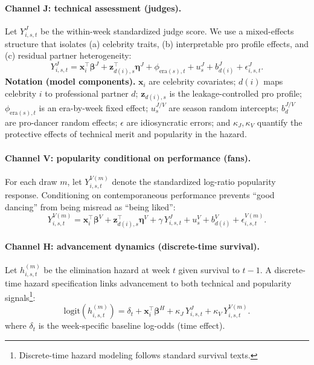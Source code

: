 \paragraph{Channel J: technical assessment (judges).}
Let $Y^J_{i,s,t}$ be the within-week standardized judge score. We use a mixed-effects structure that isolates (a) celebrity traits, (b) interpretable pro profile effects, and (c) residual partner heterogeneity:
\begin{equation}
Y^J_{i,s,t}
=
\mathbf x_i^\top \boldsymbol\beta^J
+
\mathbf z_{d(i),s}^\top \boldsymbol\eta^J
+
\phi_{\mathrm{era}(s),t}
+
u_s^J
+
b^J_{d(i)}
+
\epsilon^J_{i,s,t}.
\label{eq:q3_judge_lmm}
\end{equation}
\noindent\textbf{Notation (model components).}
$\mathbf x_i$ are celebrity covariates; $d(i)$ maps celebrity $i$ to professional partner $d$; $\mathbf z_{d(i),s}$ is the leakage-controlled pro profile; $\phi_{\mathrm{era}(s),t}$ is an era-by-week fixed effect; $u_s^{J/V}$ are season random intercepts; $b_{d}^{J/V}$ are pro-dancer random effects; $\epsilon$ are idiosyncratic errors; and $\kappa_J,\kappa_V$ quantify the protective effects of technical merit and popularity in the hazard.


\paragraph{Channel V: popularity conditional on performance (fans).}
For each draw $m$, let $Y^{V(m)}_{i,s,t}$ denote the standardized log-ratio popularity response. Conditioning on contemporaneous performance prevents ``good dancing'' from being misread as ``being liked'':
\begin{equation}
Y^{V(m)}_{i,s,t}
=
\mathbf x_i^\top \boldsymbol\beta^V
+
\mathbf z_{d(i),s}^\top \boldsymbol\eta^V
+
\gamma\, Y^J_{i,s,t}
+
u_s^V
+
b^V_{d(i)}
+
\epsilon^{V(m)}_{i,s,t}.
\label{eq:q3_fan_lmm}
\end{equation}

\paragraph{Channel H: advancement dynamics (discrete-time survival).}
Let $h^{(m)}_{i,s,t}$ be the elimination hazard at week $t$ given survival to $t{-}1$.
A discrete-time hazard specification links advancement to both technical and popularity signals\footnote{Discrete-time hazard modeling follows standard survival texts.}:
\begin{equation}
\mathrm{logit}\!\left(h^{(m)}_{i,s,t}\right)
=
\delta_t
+
\mathbf x_i^\top \boldsymbol\beta^H
+
\kappa_J\, Y^J_{i,s,t}
+
\kappa_V\, Y^{V(m)}_{i,s,t}.
\label{eq:q3_hazard}
\end{equation}
where $\delta_t$ is the week-specific baseline log-odds (time effect).

